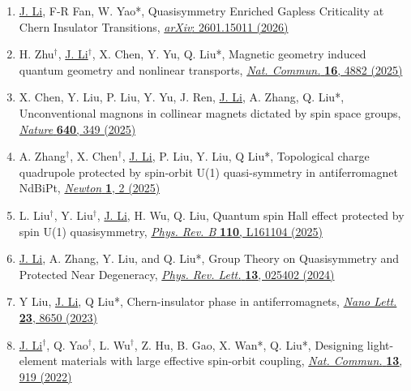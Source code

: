 \documentclass[a4paper,11pt]{article}
\begin{document}
\begin{enumerate}[leftmargin=*]

    \item \underline{J. Li}, F-R Fan, W. Yao*, Quasisymmetry Enriched Gapless Criticality at Chern Insulator Transitions, \href{https://arxiv.org/abs/2601.15011}{\textit{arXiv}: 2601.15011 (2026)}

    \item H. Zhu$^{\dagger}$, \underline{J. Li$^{\dagger}$}, X. Chen, Y. Yu, Q. Liu*, Magnetic geometry induced quantum geometry and nonlinear transports, \href{https://www.nature.com/articles/s41467-025-60128-2}{\textit{Nat. Commun.} \textbf{16}, 4882 (2025)}

    \item X. Chen, Y. Liu, P. Liu, Y. Yu, J. Ren, \underline{J. Li}, A. Zhang, Q. Liu*, Unconventional magnons in collinear magnets dictated by spin space groups, \href{https://www.nature.com/articles/s41586-025-08715-7}{\textit{Nature} \textbf{640}, 349 (2025)}

    \item A. Zhang$^{\dagger}$, X. Chen$^{\dagger}$, \underline{J. Li}, P. Liu, Y. Liu, Q Liu*, Topological charge quadrupole protected by spin-orbit U(1) quasi-symmetry in antiferromagnet NdBiPt, \href{https://www.cell.com/newton/fulltext/S2950-6360(25)00002-7}{\textit{Newton} \textbf{1}, 2 (2025)}

    \item L. Liu$^{\dagger}$, Y. Liu$^{\dagger}$, \underline{J. Li}, H. Wu, Q. Liu, Quantum spin Hall effect protected by spin U(1) quasisymmetry, \href{https://journals.aps.org/prb/abstract/10.1103/PhysRevB.110.L161104}{\textit{Phys. Rev. B} \textbf{110}, L161104 (2025)}

    \item \underline{J. Li}, A. Zhang, Y. Liu, and Q. Liu*, Group Theory on Quasisymmetry and Protected Near Degeneracy, \href{https://journals.aps.org/prl/abstract/10.1103/PhysRevLett.133.026402}{\textit{Phys. Rev. Lett.} \textbf{13}, 025402 (2024)} 

    \item Y Liu, \underline{J. Li}, Q Liu*, Chern-insulator phase in antiferromagnets, \href{https://pubs.acs.org/doi/abs/10.1021/acs.nanolett.3c02489}{\textit{Nano Lett.} \textbf{23}, 8650 (2023)}

    \item \underline{J. Li$^{\dagger}$}, Q. Yao$^{\dagger}$, L. Wu$^{\dagger}$, Z. Hu, B. Gao, X. Wan*, Q. Liu*, Designing light-element materials with large effective spin-orbit coupling, \href{https://www.nature.com/articles/s41467-022-28534-y}{\textit{Nat. Commun.} \textbf{13}, 919 (2022)}


\end{enumerate}
\end{document}

